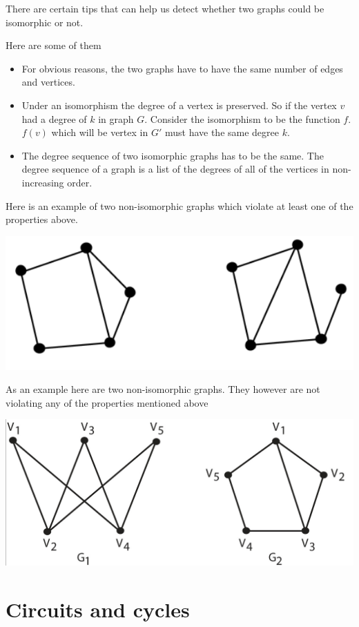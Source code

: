 \documentclass[12pt]{article}
\begin{document}
There are certain tips that can help us detect whether two graphs could be isomorphic or not.

Here are some of them

\begin{itemize}
\item For obvious reasons, the two graphs have to have the same number of edges and vertices.
\item Under an isomorphism the degree of a vertex is preserved. So if the vertex $v$ had a degree of $k$ in graph $G$. Consider the isomorphism to be the function $f$. $f(v)$ which will be vertex in $G'$ must have the same degree $k$.
\item The degree sequence of two isomorphic graphs has to be the same. The degree sequence of a graph is a list of the degrees of all of the vertices in non-increasing order.
\end{itemize}

Here is an example of two non-isomorphic graphs which violate at least one of the properties above.

\includegraphics[scale=0.5]{./img/nonisodeg.png}


As an example here are two non-isomorphic graphs. They however are not violating any of the properties mentioned above

\includegraphics[scale=0.5]{./img/noniso.png}


\section*{Circuits and cycles}
\end{document}
